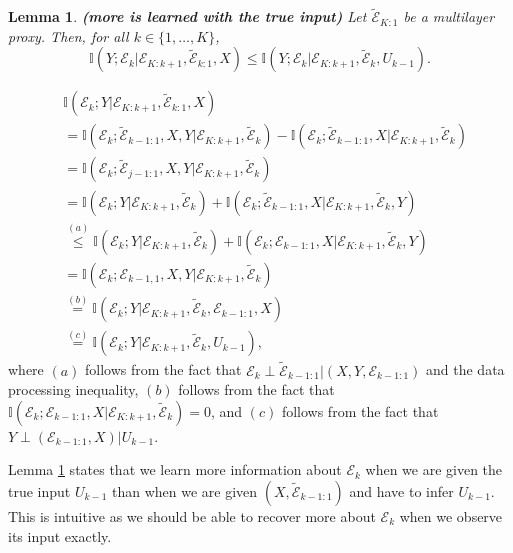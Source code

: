 \documentclass[twoside,11pt]{article}
\renewenvironment{proof}{\par\noindent{\bf Proof\ }}{\hfill\BlackBox\\[2mm]}
\newenvironment{proof}{\par\noindent{\bf Proof\ }}{\hfill\BlackBox\\[2mm]}
\newtheorem{lemma}[theorem]{Lemma}
\def\environment{\mathcal{E}}
\def\proxy{\tilde{\environment}}
\def\I{\mathbb{I}}
\begin{document}
\begin{lemma}
{\bf (more is learned with the true input)}
\label{le:true_input_inequality}
Let $\proxy_{K:1}$ be a multilayer proxy.  Then, for all $k \in \{1, \hdots, K\}$,
$$\I(Y; \environment_k|\environment_{K:k+1}, \proxy_{k: 1}, X) \leq \I(Y;\environment_k|\environment_{K:k+1}, \proxy_k, U_{k-1}).$$
\end{lemma}
\begin{proof}
    \begin{align*}
        & \I(\environment_k; Y|\environment_{K:k+1}, \proxy_{k:1}, X)\\
        & = \I(\environment_k; \proxy_{k-1:1}, X, Y|\environment_{K:k+1},\proxy_k) - \I(\environment_k; \proxy_{k-1:1}, X|\environment_{K:k+1},\proxy_k)\\
        & = \I(\environment_k; \proxy_{j-1:1}, X, Y|\environment_{K:k+1},\proxy_k)\\
        & = \I(\environment_k;Y|\environment_{K:k+1}, \proxy_k) + \I(\environment_k; \proxy_{k-1:1}, X|\environment_{K:k+1}, \proxy_k, Y)\\
        & \overset{(a)}{\leq} \I(\environment_k;Y|\environment_{K:k+1}, \proxy_k) + \I(\environment_k; \environment_{k-1:1}, X|\environment_{K:k+1}, \proxy_k, Y)\\
        & = \I(\environment_k;\environment_{k-1, 1}, X, Y|\environment_{K:k+1}, \proxy_k)\\
        & \overset{(b)}{=} \I(\environment_k;Y|\environment_{K:k+1}, \proxy_k, \environment_{k-1:1}, X)\\
        & \overset{(c)}{=} \I(\environment_k;Y|\environment_{K:k+1}, \proxy_k, U_{k-1}),
    \end{align*}
    where $(a)$ follows from the fact that $\environment_k \perp \proxy_{k-1:1}|(X, Y, \environment_{k-1:1})$ and the data processing inequality, $(b)$ follows from the fact that $\I(\environment_k;\environment_{k-1:1}, X|\environment_{K:k+1}, \proxy_k) = 0$, and $(c)$ follows from the fact that $Y\perp (\environment_{k-1:1}, X)|U_{k-1}$.
\end{proof}

Lemma \ref{le:true_input_inequality} states that we learn more information about $\environment_k$ when we are given the true input $U_{k-1}$ than when we are given $(X, \proxy_{k-1:1})$ and have to infer $U_{k-1}$. This is intuitive as we should be able to recover more about $\environment_k$ when we observe its input exactly.
\end{document}
